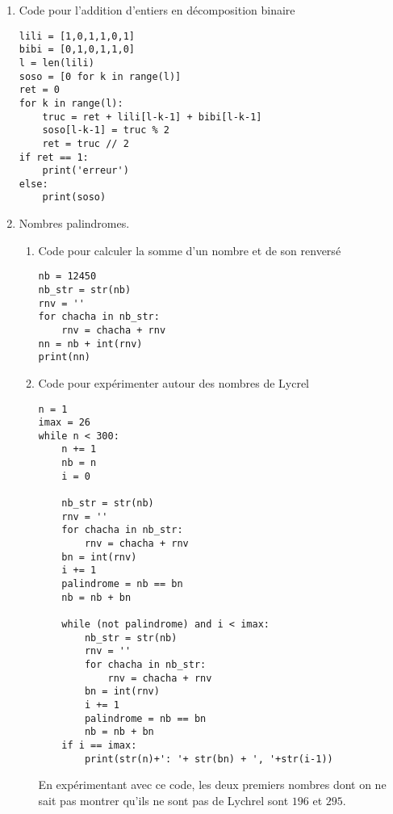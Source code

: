 \begin{enumerate}
\item Code pour l'addition d'entiers en décomposition binaire
\begin{verbatim}lili = [1,0,1,1,0,1]
bibi = [0,1,0,1,1,0]
l = len(lili)
soso = [0 for k in range(l)]
ret = 0
for k in range(l):
    truc = ret + lili[l-k-1] + bibi[l-k-1]
    soso[l-k-1] = truc % 2
    ret = truc // 2
if ret == 1:
    print('erreur')
else:
    print(soso)\end{verbatim}

\item Nombres palindromes.
\begin{enumerate}
  \item Code pour calculer la somme d'un nombre et de son renversé
\begin{verbatim}nb = 12450
nb_str = str(nb) 
rnv = ''
for chacha in nb_str:
    rnv = chacha + rnv
nn = nb + int(rnv) 
print(nn)\end{verbatim}

\item Code pour expérimenter autour des nombres de Lycrel
\begin{verbatim}n = 1
imax = 26
while n < 300:
    n += 1
    nb = n
    i = 0

    nb_str = str(nb) 
    rnv = ''
    for chacha in nb_str:
        rnv = chacha + rnv
    bn = int(rnv)    
    i += 1
    palindrome = nb == bn
    nb = nb + bn

    while (not palindrome) and i < imax:
        nb_str = str(nb) 
        rnv = ''
        for chacha in nb_str:
            rnv = chacha + rnv
        bn = int(rnv)    
        i += 1
        palindrome = nb == bn
        nb = nb + bn
    if i == imax:
        print(str(n)+': '+ str(bn) + ', '+str(i-1))\end{verbatim}
En expérimentant avec ce code, les deux premiers nombres dont on ne sait pas montrer qu'ils ne sont pas de Lychrel sont $196$ et $295$.
\end{enumerate}

\end{enumerate}
